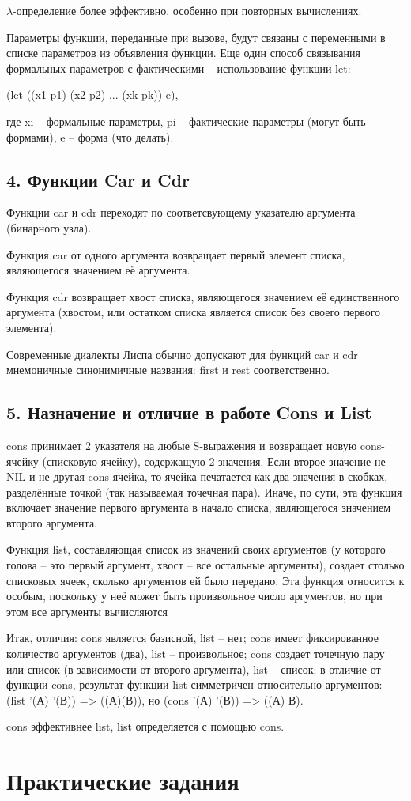 \documentclass[12pt]{report}
\begin{document}
	$\lambda$-определение более эффективно, особенно при повторных вычислениях. 
	
	Параметры функции, переданные при вызове, будут связаны с переменными в списке параметров из объявления функции. Еще один способ связывания формальных параметров с фактическими -- использование функции let:
	
	(let ((x1 p1) (x2 p2) ... (xk pk))  e),
	
	где xi -- формальные параметры, pi -- фактические параметры (могут быть формами), e -- форма (что делать).
	
	\section*{4. Функции Car и Cdr}
	
	Функции car и cdr переходят по соответсвующему указателю аргумента (бинарного узла).
	
	Функция car от одного аргумента возвращает первый элемент списка, являющегося значением её аргумента. 
	
	Функция cdr возвращает хвост списка, являющегося значением её единственного аргумента (хвостом, или остатком списка является список  без своего первого элемента).  
	
	Современные диалекты  Лиспа обычно допускают для функций car и cdr мнемоничные синонимичные названия: first и rest соответственно.
	
	\section*{5. Назначение и отличие в работе Cons и List}
	
	cons принимает 2 указателя на любые S-выражения и возвращает новую cons-ячейку (списковую ячейку), содержащую 2 значения. Если второе значение не NIL и не другая cons-ячейка, то ячейка печатается как два значения в скобках, разделённые точкой (так называемая точечная пара). Иначе, по сути, эта функция включает значение первого аргумента в начало списка, являющегося значением второго аргумента. 
	
	Функция list, составляющая список из значений своих аргументов (у которого голова -- это первый аргумент, хвост -- все остальные аргументы), создает столько списковых ячеек, сколько аргументов ей было передано. Эта функция относится к особым, поскольку у неё может быть произвольное число аргументов, но при этом все аргументы вычисляются
	
	Итак, отличия: cons является базисной, list -- нет; cons имеет  фиксированное количество аргументов (два), list -- произвольное; cons создает точечную пару или список (в зависимости от второго аргумента), list -- список; в отличие от функции cons, результат функции list симметричен относительно аргументов: (list '(А) '(В)) => ((А)(В)), но (cons '(А) '(В)) => ((А) В).
	
	cons эффективнее list, list определяется с помощью cons.
		
	\chapter*{Практические задания}	
	
	
	
	
	
\end{document}
